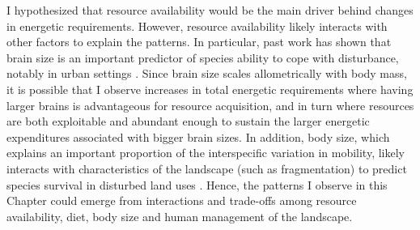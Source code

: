 I hypothesized that resource availability would be the main driver behind changes in energetic requirements. However, resource availability likely interacts with other factors to explain the patterns. In particular, past work has shown that brain size is an important predictor of species ability to cope with disturbance, notably in urban settings \citep{Sayol2020}. Since brain size scales allometrically with body mass, it is possible that I observe increases in total energetic requirements where having larger brains is advantageous for resource acquisition, and in turn where resources are both exploitable and abundant enough to sustain the larger energetic expenditures associated with bigger brain sizes. In addition, body size, which explains an important proportion of the interspecific variation in mobility, likely interacts with characteristics of the landscape (such as fragmentation) to predict species survival in disturbed land uses \citep{Merckx2018}. Hence, the patterns I observe in this Chapter could emerge from interactions and trade-offs among resource availability, diet, body size and human management of the landscape. 

